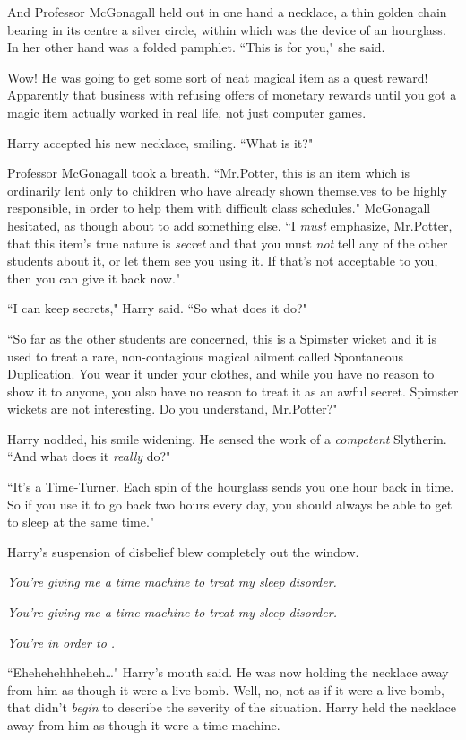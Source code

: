 And Professor McGonagall held out in one hand a necklace, a thin golden chain bearing in its centre a silver circle, within which was the device of an hourglass. In her other hand was a folded pamphlet. ``This is for you," she said.

Wow! He was going to get some sort of neat magical item as a quest reward! Apparently that business with refusing offers of monetary rewards until you got a magic item actually worked in real life, not just computer games.

Harry accepted his new necklace, smiling. ``What is it?"

Professor McGonagall took a breath. ``Mr.\?Potter, this is an item which is ordinarily lent only to children who have already shown themselves to be highly responsible, in order to help them with difficult class schedules." McGonagall hesitated, as though about to add something else. ``I \emph{must} emphasize, Mr.\?Potter, that this item's true nature is \emph{secret} and that you must \emph{not} tell any of the other students about it, or let them see you using it. If that's not acceptable to you, then you can give it back now."

``I can keep secrets," Harry said. ``So what does it do?"

``So far as the other students are concerned, this is a Spimster wicket and it is used to treat a rare, non-contagious magical ailment called Spontaneous Duplication. You wear it under your clothes, and while you have no reason to show it to anyone, you also have no reason to treat it as an awful secret. Spimster wickets are not interesting. Do you understand, Mr.\?Potter?"

Harry nodded, his smile widening. He sensed the work of a \emph{competent} Slytherin. ``And what does it \emph{really} do?"

``It's a Time-Turner. Each spin of the hourglass sends you one hour back in time. So if you use it to go back two hours every day, you should always be able to get to sleep at the same time."

Harry's suspension of disbelief blew completely out the window.

\emph{You're giving me a time machine to treat my sleep disorder.}

\emph{You're giving me a \emph{time machine} to treat my \emph{sleep disorder}.}

\emph{You're  in order to .}

``Ehehehehhheheh{\ldots}" Harry's mouth said. He was now holding the necklace away from him as though it were a live bomb. Well, no, not as if it were a live bomb, that didn't \emph{begin} to describe the severity of the situation. Harry held the necklace away from him as though it were a time machine.

